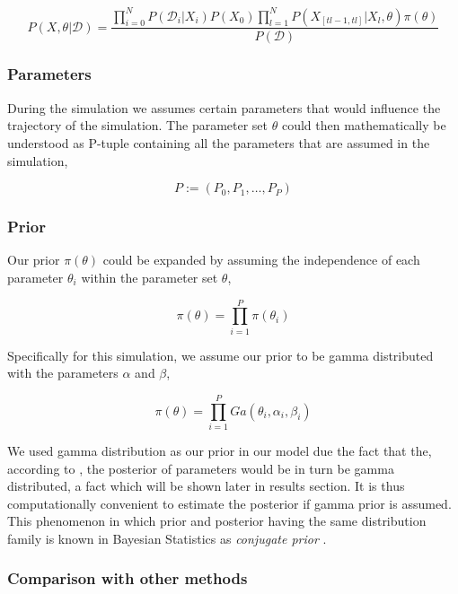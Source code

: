 \documentclass{bioinfo}
\begin{document}
\begin{equation}
P(X, \theta | \mathcal{D}) = \frac{\prod_{i=0}^{N} P(\mathcal{D}_i | X_i) P(X_0) \prod_{l=1}^{N} P(X_{[tl-1, tl]} | X_l, \theta)\pi(\theta)}{P(\mathcal{D})}\label{eq:07}
\end{equation}

\subsubsection{Parameters}

During the simulation we assumes certain parameters that would influence the trajectory of the simulation. The parameter set $\theta$ could then mathematically be understood as P-tuple containing all the parameters that are assumed in the simulation,

\begin{equation}
P := (P_0, P_1, \dots , P_P)\label{eq:08}
\end{equation}

\subsubsection{Prior}

Our prior $\pi(\theta)$ could be expanded by assuming the independence of each parameter $\theta_i$ within the parameter set $\theta$,

\begin{equation}
\pi(\theta) = \prod_{i=1}^{P} \pi(\theta_i)\label{eq:09}
\end{equation}

Specifically for this simulation, we assume our prior to be gamma distributed with the parameters $\alpha$ and $\beta$,

\begin{equation}
\pi(\theta) = \prod_{i=1}^{P} Ga(\theta_i, \alpha_i, \beta_i)\label{eq:10}
\end{equation}

We used gamma distribution as our prior in our model due the fact that the, according to \citep{Feigelman16}, the posterior of parameters would be in turn be gamma distributed, a fact which will be shown later in results section. It is thus computationally convenient to estimate the posterior if gamma prior is assumed. This phenomenon in which prior and posterior having the same distribution family is known in Bayesian Statistics as \textit{conjugate prior} \citep{Gelman14}.

\subsubsection{Comparison with other methods}
\end{document}
